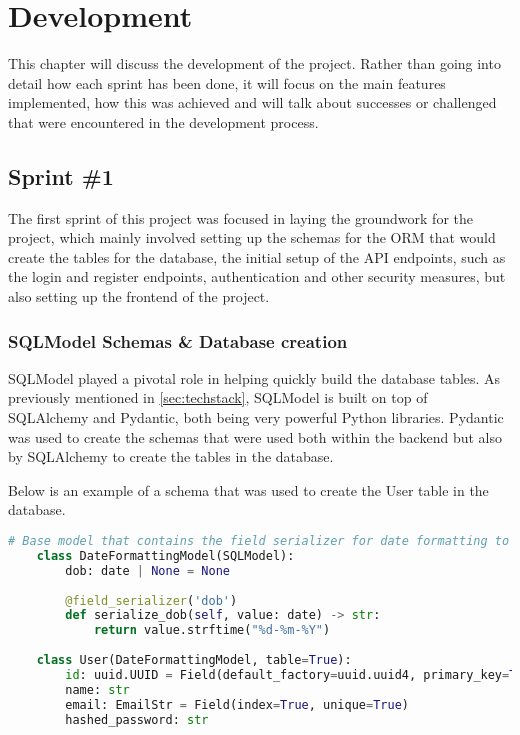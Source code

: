 \chapter{Development}

This chapter will discuss the development of the project. Rather than going into detail how each sprint has been done, it will focus on the main features implemented, how this was achieved and will talk about successes or challenged that were encountered in the development process.

\section{Sprint \#1}

The first sprint of this project was focused in laying the groundwork for the project, which mainly involved setting up the schemas for the ORM that would create the tables for the database, the initial setup of the API endpoints, such as the login and register endpoints, authentication and other security measures, but also setting up the frontend of the project.

\subsection{SQLModel Schemas \& Database creation}

SQLModel played a pivotal role in helping quickly build the database tables. As previously mentioned in \ref{sec:techstack}, SQLModel is built on top of SQLAlchemy and Pydantic, both being very powerful Python libraries. Pydantic was used to create the schemas that were used both within the backend but also by SQLAlchemy to create the tables in the database. 

Below is an example of a schema that was used to create the User table in the database.

\begin{lstlisting}[language=Python, caption=SQLModel User Schema]
# Base model that contains the field serializer for date formatting to dd-mm-yyyy and the date field itself
    class DateFormattingModel(SQLModel):
        dob: date | None = None
    
        @field_serializer('dob')
        def serialize_dob(self, value: date) -> str:
            return value.strftime("%d-%m-%Y")
    
    class User(DateFormattingModel, table=True):
        id: uuid.UUID = Field(default_factory=uuid.uuid4, primary_key=True)
        name: str
        email: EmailStr = Field(index=True, unique=True)
        hashed_password: str
\end{lstlisting}

